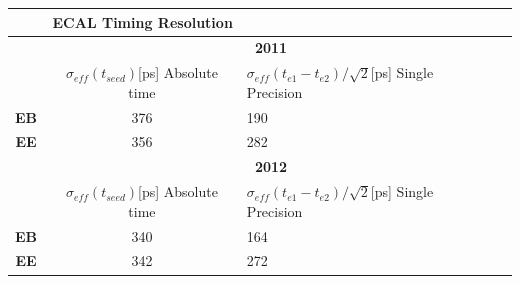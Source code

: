 \begin{center}
\centering
  \begin{tabular}{|cc|l|l|} %
  \hline \hline
 
 &  \multicolumn{1}{r}{\bfseries{ECAL Timing Resolution}} \\
  \hline \hline
&  \multicolumn{2}{c}{\bfseries{2011}} \\
   \hline
   & $\sigma_{eff}(t_{seed})$[ps]
        Absolute time
   & $\sigma_{eff}(t_{e1} - t_{e2})/\sqrt{2}$[ps]   Single Precision \\ \hline
   \textbf{EB} & 376  & 190 \\
      \textbf{EE} & 356  & 282 \\
      \hline \hline
& \multicolumn{2}{c}{\bfseries{2012}}  \\
   \hline
   & $\sigma_{eff}(t_{seed})$[ps]
        Absolute time
   & $\sigma_{eff}(t_{e1} - t_{e2})/\sqrt{2}$[ps]   Single Precision \\ \hline
   \textbf{EB} & 340  & 164 \\
      \textbf{EE} & 342  & 272 \\
      \hline \hline
 
  \end{tabular}
 \label{tab:TIMERes} %
 \end{center}



\label{ECAL Timing Calibration_chapter}
